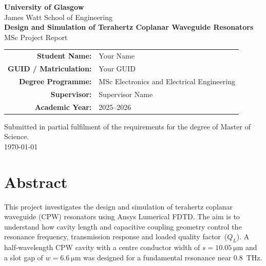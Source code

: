 \documentclass[12pt,a4paper]{article}
\newcommand{\projecttitle}{Design and Simulation of Terahertz Coplanar Waveguide Resonators}
\newcommand{\studentname}{Your Name}
\newcommand{\studentid}{Your GUID}
\newcommand{\supervisor}{Supervisor Name}
\newcommand{\degreeprogramme}{MSc Electronics and Electrical Engineering}
\newcommand{\school}{James Watt School of Engineering}
\newcommand{\university}{University of Glasgow}
\newcommand{\academicyear}{2025--2026}
\begin{document}
\begin{titlepage}
    \centering
    \vspace*{1.5cm}
    {\Large \textbf{\university}}\\[0.3cm]
    {\large \school}\\[1.5cm]
    {\Huge \textbf{\projecttitle}}\\[1.5cm]
    {\Large MSc Project Report}\\[1cm]
    \begin{tabular}{rl}
        \textbf{Student Name:}          & \studentname  \\[4pt]
        \textbf{GUID / Matriculation:}  & \studentid    \\[4pt]
        \textbf{Degree Programme:}      & \degreeprogramme \\[4pt]
        \textbf{Supervisor:}            & \supervisor   \\[4pt]
        \textbf{Academic Year:}         & \academicyear \\
    \end{tabular}
    \vfill
    {\large Submitted in partial fulfilment of the requirements for the
    degree of Master of Science.}\\[0.5cm]
    {\large \today}
\end{titlepage}

\newpage
\section*{Abstract}

This project investigates the design and simulation of terahertz coplanar
waveguide (CPW) resonators using Ansys Lumerical FDTD. The aim is to
understand how cavity length and capacitive coupling geometry control the
resonance frequency, transmission response and loaded quality factor~($Q_L$).
A half-wavelength CPW cavity with a centre conductor width of
$s = \SI{10.05}{\micro\metre}$ and a slot gap of $w = \SI{6.6}{\micro\metre}$
was designed for a fundamental resonance near \SI{0.8}{\tera\hertz}.
\end{document}
